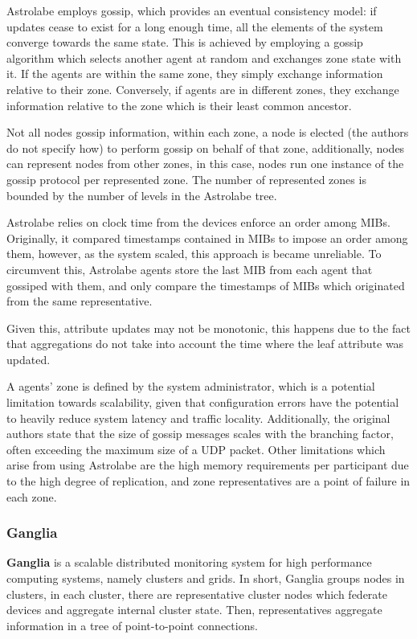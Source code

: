 Astrolabe employs gossip, which provides an eventual consistency model: if updates cease to exist for a long enough time, all the elements of the system  converge towards the same state. This is achieved by employing a gossip algorithm which selects another agent at random and exchanges zone state with it. If the agents are within the same zone, they simply exchange information relative to their zone. Conversely, if agents are in different zones, they exchange information relative to the zone which is their least common ancestor.

Not all nodes gossip information, within each zone, a node is elected (the authors do not specify how) to perform gossip on behalf of that zone, additionally, nodes can represent nodes from other zones, in this case, nodes run one instance of the gossip protocol per represented zone. The number of represented zones is bounded by the number of levels in the Astrolabe tree.

Astrolabe relies on clock time from the devices enforce an order among MIBs. Originally, it compared timestamps contained in MIBs to impose an order among them, however, as the system scaled, this approach is became unreliable. To circumvent this, Astrolabe agents store the last MIB from each agent that gossiped with them, and only compare the timestamps of MIBs which originated from the same representative.

Given this, attribute updates may not be monotonic, this happens due to the fact that aggregations do not take into account the time where the leaf attribute was updated. 

A agents' zone is defined by the system administrator, which is a potential limitation towards scalability, given that configuration errors have the potential to heavily reduce system latency and traffic locality. Additionally, the original authors state that the size of gossip messages scales with the branching factor, often exceeding the maximum size of a UDP packet. Other limitations which arise from using Astrolabe are the high memory requirements per participant due to the high degree of replication, and zone representatives are a point of failure in each zone. 

\subsubsection{Ganglia}

\textbf{Ganglia} is a scalable distributed monitoring system \cite{massie2004ganglia} for high performance computing systems, namely clusters and grids. In short, Ganglia groups nodes in clusters, in each cluster, there are representative cluster nodes which federate devices and aggregate internal cluster state. Then, representatives aggregate information in a tree of point-to-point connections.

